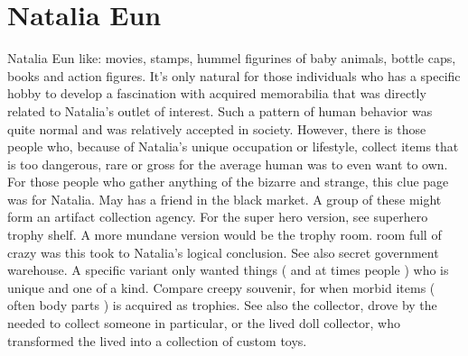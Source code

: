 \documentclass[12pt]{book}
\begin{document}
\chapter{Natalia Eun}

Natalia Eun like: movies, stamps, hummel figurines of baby animals, bottle caps, books and action figures. It's only natural for those individuals who has a specific hobby to develop a fascination with acquired memorabilia that was directly related to Natalia's outlet of interest. Such a pattern of human behavior was quite normal and was relatively accepted in society. However, there is those people who, because of Natalia's unique occupation or lifestyle, collect items that is too dangerous, rare or gross for the average human was to even want to own. For those people who gather anything of the bizarre and strange, this clue page was for Natalia. May has a friend in the black market. A group of these might form an artifact collection agency. For the super hero version, see superhero trophy shelf. A more mundane version would be the trophy room. room full of crazy was this took to Natalia's logical conclusion. See also secret government warehouse. A specific variant only wanted things ( and at times people ) who is unique and one of a kind. Compare creepy souvenir, for when morbid items ( often body parts ) is acquired as trophies. See also the collector, drove by the needed to collect someone in particular, or the lived doll collector, who transformed the lived into a collection of custom toys.
\end{document}
